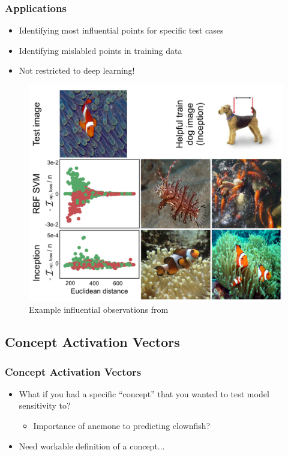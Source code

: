 \documentclass[10pt,mathserif]{beamer}
\begin{document}
\begin{frame}
  \frametitle{Applications}
  \begin{itemize}
  \item Identifying most influential points for specific test cases
  \item Identifying mislabled points in training data
  \item Not restricted to deep learning!
  \end{itemize} 
\begin{figure}[ht]
  \centering
  \includegraphics[width=0.45\paperwidth]{figure/influential}
  \caption{Example influential observations from \citep{}\label{fig:influential}
  }
\end{figure}
\end{frame}

\subsection{Concept Activation Vectors}

\begin{frame}
  \frametitle{Concept Activation Vectors}
  \begin{itemize}
  \item What if you had a specific ``concept'' that you wanted to test model
    sensitivity to?
    \begin{itemize}
    \item Importance of anemone to predicting clownfish?
    \end{itemize}
  \item Need workable definition of a concept...
  \end{itemize}
\end{frame}
\end{document}
